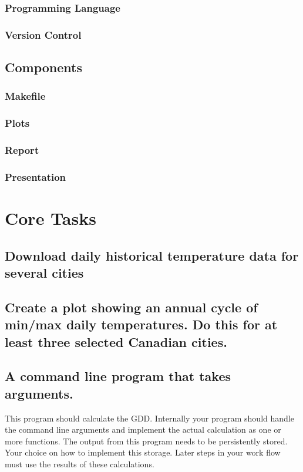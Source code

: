 \documentclass{article}
\begin{document}
\subsubsection{Programming Language}
\subsubsection{Version Control}
\subsection{Components}
\subsubsection{Makefile}
\subsubsection{Plots}
\subsubsection{Report}
\subsubsection{Presentation}

\section{ \bf Core Tasks}
\subsection{Download daily historical temperature data for several cities}
\subsection{Create a plot showing an annual cycle of min/max daily temperatures. Do this for at least three selected Canadian cities.}
\subsection{A command line program that takes arguments.}
This program should calculate the GDD. Internally your program should handle the command line arguments and implement the actual calculation as one or more functions. The output from this program needs to be persistently stored. Your choice on how to implement this storage. Later steps in your work flow must use the results of these calculations.
\end{document}
